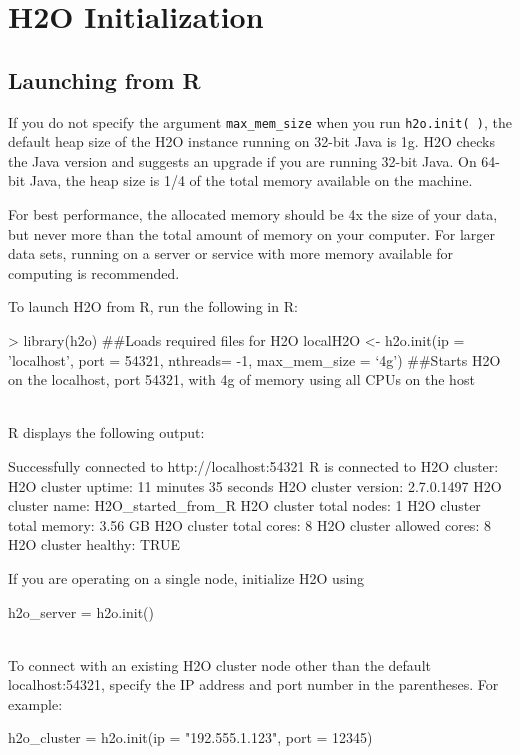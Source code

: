 \documentclass[11pt]{article}
\begin{document}
\section{H2O Initialization}

\subsection{Launching from R}

If you do not specify the argument {\texttt{max\_mem\_size}} when you run {\texttt{h2o.init( )}}, the default heap size of the H2O instance running on 32-bit Java is 1g. H2O checks the Java version and suggests an upgrade if you are running 32-bit Java. On 64-bit Java, the heap size is 1/4 of the total memory available on the machine. 

For best performance, the allocated memory should be 4x the size of your data, but never more than the total amount of memory on your computer. For larger data sets, running on a server or service with more memory available for computing is recommended.


To launch H2O from R, run the following in R:
\begin{spverbatim}
> library(h2o) ##Loads required files for H2O
localH2O <- h2o.init(ip = 'localhost', port = 54321, nthreads= -1, max_mem_size = ‘4g') ##Starts H2O on the localhost, port 54321, with 4g of memory using all CPUs on the host  \end{spverbatim} 
\\

R displays the following output: 
\begin{spverbatim}
Successfully connected to http://localhost:54321
       R is connected to H2O cluster:
   H2O cluster uptime:         11 minutes 35 seconds
   H2O cluster version:        2.7.0.1497
   H2O cluster name:           H2O_started_from_R
   H2O cluster total nodes:    1
   H2O cluster total memory:   3.56 GB
   H2O cluster total cores:    8
   H2O cluster allowed cores:  8
   H2O cluster healthy:        TRUE
\end{spverbatim}

If you are operating on a single node, initialize H2O using \begin{spverbatim} h2o_server = h2o.init()\end{spverbatim}\\

To connect with an existing H2O cluster node other than the default localhost:54321, specify the IP address and port number in the parentheses. For example: \begin{spverbatim}h2o_cluster = h2o.init(ip = "192.555.1.123", port = 12345)\end{spverbatim}
\end{document}
